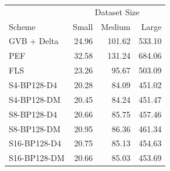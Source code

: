 \begin{tabular}{lrrr}
\toprule
 & \multicolumn{3}{c}{Dataset Size} \\
Scheme & Small & Medium & Large \\
\midrule
GVB + Delta & 24.96 & 101.62 & 533.10 \\
PEF & 32.58 & 131.24 & 684.06 \\
FLS & 23.26 & 95.67 & 503.09 \\
S4-BP128-D4 & 20.28 & 84.09 & 451.02 \\
S4-BP128-DM & 20.45 & 84.24 & 451.47 \\
S8-BP128-D4 & 20.66 & 85.75 & 457.46 \\
S8-BP128-DM & 20.95 & 86.36 & 461.34 \\
S16-BP128-D4 & 20.75 & 85.13 & 454.63 \\
S16-BP128-DM & 20.66 & 85.03 & 453.69 \\
\bottomrule
\end{tabular}
